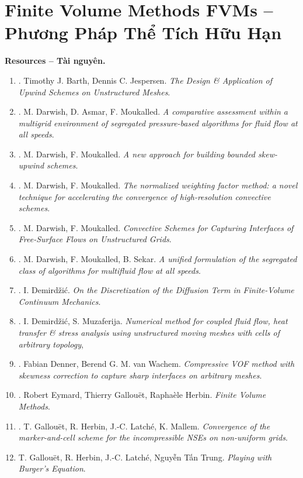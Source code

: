\documentclass{article}
\begin{document}
\section{Finite Volume Methods FVMs -- Phương Pháp Thể Tích Hữu Hạn}
\textbf{\textsf{Resources -- Tài nguyên.}}
\begin{enumerate}
	\item \cite{Barth_Jespersen1989}. {\sc Timothy J. Barth, Dennis C. Jespersen}. {\it The Design \& Application of Upwind Schemes on Unstructured Meshes}.
	\item \cite{Darwish_Asmar_Moukalled2004}. {\sc M. Darwish, D. Asmar, F. Moukalled}. {\it A comparative assessment within a multigrid environment of segregated pressure-based algorithms for fluid flow at all speeds}.
	\item \cite{Darwish_Moukalled1996}. {\sc M. Darwish, F. Moukalled}. {\it A new approach for building bounded skew-upwind schemes}.
	\item \cite{Darwish_Moukalled1996a}. {\sc M. Darwish, F. Moukalled}. {\it The normalized weighting factor method: a novel technique for accelerating the convergence of high-resolution convective schemes}.
	\item \cite{Darwish_Moukalled2006}. {\sc M. Darwish, F. Moukalled}. {\it Convective Schemes for Capturing Interfaces of Free-Surface Flows on Unstructured Grids}.
	\item \cite{Darwish_Moukalled_Sekar2001}. {\sc M. Darwish, F. Moukalled, B. Sekar}. {\it A unified formulation of the segregated class of algorithms for multifluid flow at all speeds}.
	\item \cite{Demirdzic2015}. {\sc I. Demird\v{z}i\'c}. {\it On the Discretization of the Diffusion Term in Finite-Volume Continuum Mechanics}.
	\item \cite{Demirdzic_Muzaferija1995}. {\sc I. Demird\v{z}i\'c, S. Muzaferija}. {\it Numerical method for coupled fluid flow, heat transfer \& stress analysis using unstructured moving meshes with cells of arbitrary topology},
	\item \cite{Denner_vanWachem2014}. {\sc Fabian Denner, Berend G. M. van Wachem}. {\it Compressive VOF method with skewness correction to capture sharp interfaces on arbitrary meshes}.
	\item \cite{Eymard_Gallouet_Herbin2019}. {\sc Robert Eymard, Thierry Gallou\"et, Rapha\`ele Herbin}. {\it Finite Volume Methods}.
	\item \cite{Gallouet_Herbin_Latche_Mallem2018}. {\sc T. Gallou\"{e}t, R. Herbin, J.-C. Latch\'{e},  K. Mallem}. {\it Convergence of the marker-and-cell scheme for the incompressible NSEs on non-uniform grids}.
	\item {\sc T. Gallou\"{e}t, R. Herbin, J.-C. Latch\'{e}, Nguyễn Tấn Trung}. {\it Playing with Burger's Equation}. {\sf[4 citations]}
	

\end{enumerate}
\end{document}
